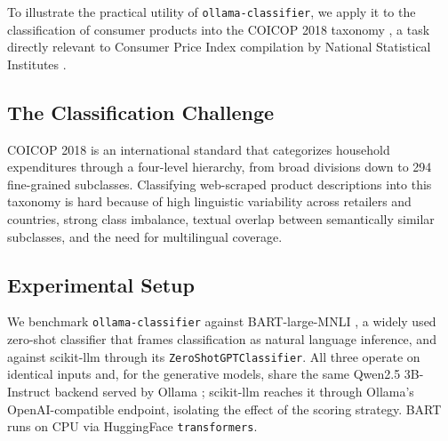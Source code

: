 \documentclass[11pt,a4paper]{article}
\begin{document}
To illustrate the practical utility of \texttt{ollama-classifier}, we apply it
to the classification of consumer products into the COICOP 2018 taxonomy
\citep{un2018coicop}, a task directly relevant to Consumer Price Index
compilation by National Statistical Institutes \citep{cavallo2013online,
cavallo2017online}.

\subsection{The Classification Challenge}

COICOP 2018 is an international standard that categorizes household
expenditures through a four-level hierarchy, from broad divisions down to 294
fine-grained subclasses. Classifying web-scraped product descriptions into
this taxonomy is hard because of high linguistic variability across retailers
and countries, strong class imbalance, textual overlap between semantically
similar subclasses, and the need for multilingual coverage.



\subsection{Experimental Setup}
\label{sec:setup}

We benchmark \texttt{ollama-classifier} against BART-large-MNLI
\citep{lewis2019bart, williams2018mnli}, a widely used zero-shot classifier
that frames classification as natural language inference, and against
scikit-llm \citep{ScikitLLM} through its \texttt{ZeroShotGPTClassifier}. All
three operate on identical inputs and, for the generative models, share the
same Qwen2.5 3B-Instruct backend \citep{yang2024qwen2} served by Ollama
\citep{ollama}; scikit-llm reaches it through Ollama's OpenAI-compatible
endpoint, isolating the effect of the scoring strategy. BART runs on CPU via
HuggingFace \texttt{transformers}.
\end{document}
